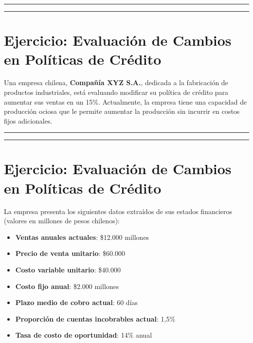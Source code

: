 \documentclass[
  letterpaper,
  DIV=11,
  numbers=noendperiod]{scrartcl}
\providecommand{\tightlist}{%
  \setlength{\itemsep}{0pt}\setlength{\parskip}{0pt}}\usepackage{longtable,booktabs,array}
\begin{document}
\begin{center}\rule{0.5\linewidth}{0.5pt}\end{center}

\begin{center}\rule{0.5\linewidth}{0.5pt}\end{center}

\section{Ejercicio: Evaluación de Cambios en Políticas de
Crédito}\label{ejercicio-evaluaciuxf3n-de-cambios-en-poluxedticas-de-cruxe9dito}

Una empresa chilena, \textbf{Compañía XYZ S.A.}, dedicada a la
fabricación de productos industriales, está evaluando modificar su
política de crédito para aumentar sus ventas en un 15\%. Actualmente, la
empresa tiene una capacidad de producción ociosa que le permite aumentar
la producción sin incurrir en costos fijos adicionales.

\begin{center}\rule{0.5\linewidth}{0.5pt}\end{center}

\begin{center}\rule{0.5\linewidth}{0.5pt}\end{center}

\section{Ejercicio: Evaluación de Cambios en Políticas de
Crédito}\label{ejercicio-evaluaciuxf3n-de-cambios-en-poluxedticas-de-cruxe9dito-1}

La empresa presenta los siguientes datos extraídos de sus estados
financieros (valores en millones de pesos chilenos):

\begin{itemize}
\tightlist
\item
  \textbf{Ventas anuales actuales}: \$12.000 millones
\item
  \textbf{Precio de venta unitario}: \$60.000
\item
  \textbf{Costo variable unitario}: \$40.000
\item
  \textbf{Costo fijo anual}: \$2.000 millones
\item
  \textbf{Plazo medio de cobro actual}: 60 días
\item
  \textbf{Proporción de cuentas incobrables actual}: 1,5\%
\item
  \textbf{Tasa de costo de oportunidad}: 14\% anual
\end{itemize}
\end{document}

